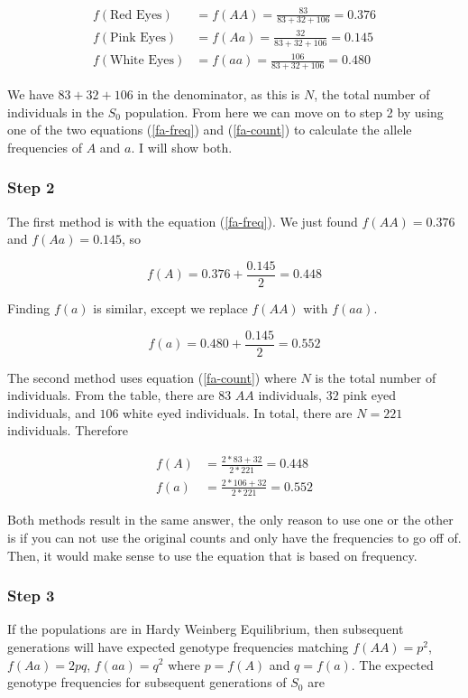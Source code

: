 \documentclass[12pt]{article}
\begin{document}
\begin{align*}
    f(\text{Red Eyes}) &= f(AA) = \frac{83}{83+32+106} = 0.376 \\
    f(\text{Pink Eyes}) &=f(Aa) = \frac{32}{83+32+106} = 0.145 \\
    f(\text{White Eyes}) &=f(aa) = \frac{106}{83+32+106} = 0.480
\end{align*}

We have $83+32+106$ in the denominator, as this is $N$, the total number of individuals in the $S_0$ population. From here we can move on to step 2 by using one of the two equations (\ref{fa-freq}) and (\ref{fa-count}) to calculate the allele frequencies of $A$ and $a$. I will show both.

\subsubsection{Step 2}

The first method is with the equation (\ref{fa-freq}). We just found $f(AA)=0.376$ and $f(Aa)=0.145$, so 

$$f(A) = 0.376 + \frac{0.145}{2} = 0.448$$

Finding $f(a)$ is similar, except we replace $f(AA)$ with $f(aa)$.

$$f(a) = 0.480 + \frac{0.145}{2} = 0.552$$

The second method uses equation (\ref{fa-count}) where $N$ is the total number of individuals. From the table, there are 83 $AA$ individuals, $32$ pink eyed individuals, and $106$ white eyed individuals. In total, there are $N=221$ individuals. Therefore

\begin{align*}
    f(A) &= \frac{2*83 + 32}{2*221} = 0.448 \\
    f(a) &= \frac{2*106 + 32}{2*221} = 0.552
\end{align*}

Both methods result in the same answer, the only reason to use one or the other is if you can not use the original counts and only have the frequencies to go off of. Then, it would make sense to use the equation that is based on frequency.

\subsubsection{Step 3}

If the populations are in Hardy Weinberg Equilibrium, then subsequent generations will have expected genotype frequencies matching $f(AA) = p^2$, $f(Aa)=2pq$, $f(aa)=q^2$ where $p=f(A)$ and $q=f(a)$. The expected genotype frequencies for subsequent generations of $S_0$ are
\end{document}
